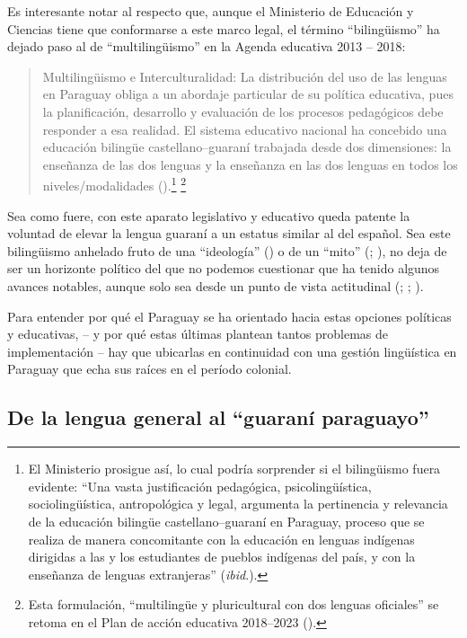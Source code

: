 \documentclass[output=paper]{langscibook}
\begin{document}
Es interesante notar al respecto que, aunque el Ministerio de Educación y Ciencias tiene que conformarse a este marco legal, el término “bilingüismo” ha dejado paso al de “multilingüismo” en la Agenda educativa 2013 -- 2018:

\begin{quote} 
Multilingüismo e Interculturalidad: La distribución del uso de las lenguas en Paraguay obliga a un abordaje particular de su política educativa, pues la planificación, desarrollo y evaluación de los procesos pedagógicos debe responder a esa realidad. El sistema educativo nacional ha concebido una educación bilingüe castellano–guaraní trabajada desde dos dimensiones: la enseñanza de las dos lenguas y la enseñanza en las dos lenguas en todos los niveles/modalidades (\citealt{RepúblicadelParaguay2013}).\footnote{El Ministerio prosigue así, lo cual podría sorprender si el bilingüismo fuera evidente: “Una vasta justificación pedagógica, psicolingüística, sociolingüística, antropológica y legal, argumenta la pertinencia y relevancia de la educación bilingüe castellano--guaraní en Paraguay, proceso que se realiza de manera concomitante con la educación en lenguas indígenas dirigidas a las y los estudiantes de pueblos indígenas del país, y con la enseñanza de lenguas extranjeras” (\textit{ibid}.).} \footnote{Esta formulación, “multilingüe y pluricultural con dos lenguas oficiales”  se retoma en el Plan de acción educativa 2018--2023 (\citealt{RepúblicadelParaguay2018b}).}
\end{quote}


Sea como fuere, con este aparato legislativo y educativo queda patente la voluntad de elevar la lengua guaraní a un estatus similar al del español. Sea este bilingüismo anhelado fruto de una “ideología” (\citealt{CouchonnalCancio2018}) o de un “mito” (\citealt{Makaran2014}; \citealt{Pic-Gillard2008}), no deja de ser un horizonte político del que no podemos cuestionar que ha tenido algunos avances notables, aunque solo sea desde un punto de vista actitudinal (\citealt{BoyerNatali2006}; \citealt{Pic-Gillard2004}; \citealt{Zajícová2009}).

Para entender por qué el Paraguay se ha orientado hacia estas opciones políticas y educativas, -- y por qué estas últimas plantean tantos problemas de implementación -- hay que ubicarlas en continuidad con una gestión lingüística en Paraguay que echa sus raíces en el período colonial.

\subsection{De la lengua general al “guaraní paraguayo”}\label{sec:blestel:2.2}
\end{document}
